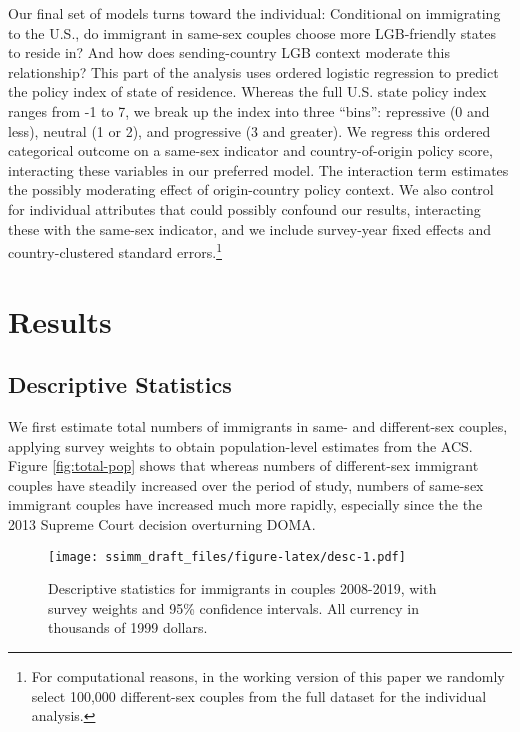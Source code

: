 \documentclass[
  11pt,
]{article}
\begin{document}
Our final set of models turns toward the individual: Conditional on immigrating to the U.S., do immigrant in same-sex couples choose more LGB-friendly states to reside in? And how does sending-country LGB context moderate this relationship? This part of the analysis uses ordered logistic regression to predict the policy index of state of residence. Whereas the full U.S. state policy index ranges from -1 to 7, we break up the index into three ``bins'': repressive (0 and less), neutral (1 or 2), and progressive (3 and greater). We regress this ordered categorical outcome on a same-sex indicator and country-of-origin policy score, interacting these variables in our preferred model. The interaction term estimates the possibly moderating effect of origin-country policy context. We also control for individual attributes that could possibly confound our results, interacting these with the same-sex indicator, and we include survey-year fixed effects and country-clustered standard errors.\footnote{For computational reasons, in the working version of this paper we randomly select 100,000 different-sex couples from the full dataset for the individual analysis.}

\hypertarget{results}{%
\section{Results}\label{results}}

\hypertarget{descriptive-statistics}{%
\subsection{Descriptive Statistics}\label{descriptive-statistics}}

We first estimate total numbers of immigrants in same- and different-sex couples, applying survey weights to obtain population-level estimates from the ACS. Figure \ref{fig:total-pop} shows that whereas numbers of different-sex immigrant couples have steadily increased over the period of study, numbers of same-sex immigrant couples have increased much more rapidly, especially since the the 2013 Supreme Court decision overturning DOMA.

\begin{figure}
\centering
\texttt{[image: ssimm\_draft\_files/figure-latex/desc-1.pdf]}
\caption{\label{fig:desc}Descriptive statistics for immigrants in couples 2008-2019, with survey weights and 95\% confidence intervals. All currency in thousands of 1999 dollars.}
\end{figure}
\end{document}
